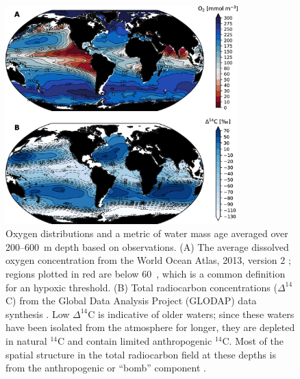 \documentclass{report_chapter}
\begin{document}
\begin{figure}[t!]
\centering
\includegraphics[width=0.8\textwidth]{woa-thermocline-o2-w-age_metric.png}
\caption{Oxygen distributions and a metric of water mass age averaged over 200--600~m depth based on observations.
(A) The average dissolved oxygen concentration from the World Ocean Atlas, 2013, version 2 \citep{Garcia-Locarnini-etal-2014}; regions plotted in red are below 60~\mmolmmm{}, which is a common definition for an hypoxic threshold.
(B) Total radiocarbon concentrations ({$\Delta^{14}$C}) from the Global Data Analysis Project (GLODAP) data synthesis \protect\citep{Key-Kozyr-etal-2004}.
Low {$\Delta^{14}$C} is indicative of older waters; since these waters have been isolated from the atmosphere for longer, they are depleted in natural {$^{14}$C} and contain limited anthropogenic {$^{14}$C}.
Most of the spatial structure in the total radiocarbon field at these depths is from the anthropogenic or ``bomb'' component \citep{Key-Kozyr-etal-2004}.}
\label{fig:woa-thermocline-o2-age}
\end{figure}
\end{document}
